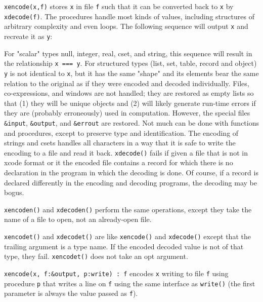 \texttt{xencode(x,f)} stores \texttt{x} in file
\texttt{f} such that it can be converted back to \texttt{x} by
\texttt{xdecode(f)}. The procedures handle most kinds of values,
including structures of arbitrary complexity and even loops. The
following sequence will output \texttt{x} and recreate it as
\texttt{y}:


\noindent For "scalar" types null, integer,
real, cset, and string, this sequence will result in the relationship
\texttt{x === y}. For structured types (list, set, table, record and object)
\texttt{y} is not identical to \texttt{x}, but it has the same
"shape" and its elements bear the same
relation to the original as if they were encoded and decoded
individually. Files, co-expressions, and windows are not handled;
they are restored as empty
lists so that (1) they will be unique objects and (2) will likely
generate run-time errors if they are (probably
erroneously) used in computation. However, the special files
\texttt{\&input}, \texttt{\&output}, and \texttt{\&errout} are
restored. Not much can be done with functions and procedures, except to
preserve type and identification. The encoding of strings and csets
handles all characters in a way that it is safe to write the encoding
to a file and read it back. \texttt{xdecode()} fails if given a file
that is not in xcode format or it the encoded file contains a record
for which there is no declaration in the program in which the decoding
is done. Of course, if a record is declared differently in the encoding
and decoding programs, the decoding may be bogus.

\texttt{xencoden()} and \texttt{xdecoden()} perform the same operations,
except they take the name of a file to open, not an already-open file.

\texttt{xencodet()} and \texttt{xdecodet()} are like \texttt{xencode()}
and \texttt{xdecode()} except that the trailing argument is a type
name. If the encoded decoded value is not of that type, they fail.
\texttt{xencodet()} does not take an opt argument. 

\texttt{xencode(x, f:\&output, p:write) : f} encodes \texttt{x} writing
to file \texttt{f} using procedure \texttt{p} that writes a line on
\texttt{f} using the same interface as \texttt{write()} (the first
parameter is always the value passed as \texttt{f}).

